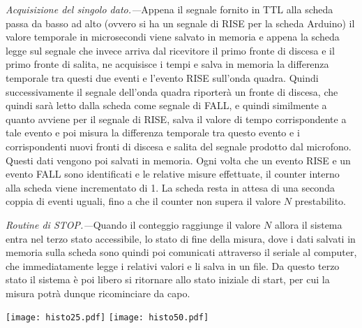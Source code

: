 \documentclass[
    rmp,
    reprint, 
    superscriptaddress, 
    altaffilletter, 
    amsmath, 
    amssymb, 
    a4paper,
    varvw]{revtex4-2}
\begin{document}
\noindent\textit{Acquisizione del singolo dato.---}Appena il segnale fornito in TTL alla scheda passa da basso ad alto (ovvero si ha un segnale di RISE per la scheda Arduino) il valore temporale in microsecondi viene salvato in memoria e appena la scheda legge sul segnale che invece arriva dal ricevitore il primo fronte di discesa e il primo fronte di salita, ne acquisisce i tempi e salva in memoria la differenza temporale tra questi due eventi e l'evento RISE sull'onda quadra. Quindi successivamente il segnale dell'onda quadra riporterà un fronte di discesa, che quindi sarà letto dalla scheda come segnale di FALL, e quindi similmente a quanto avviene per il segnale di RISE, salva il valore di tempo corrispondente a tale evento e poi misura la differenza temporale tra questo evento e i corrispondenti nuovi fronti di discesa e salita del segnale prodotto dal microfono. Questi dati vengono poi salvati in memoria. Ogni volta che un evento RISE e un evento FALL sono identificati e le relative misure effettuate, il counter interno alla scheda viene incrementato di 1. La scheda resta in attesa di una seconda coppia di eventi uguali, fino a che il counter non supera il valore $N$ prestabilito. 

\noindent\textit{Routine di \emph{STOP}.---}Quando il conteggio raggiunge il valore $N$ allora il sistema entra nel terzo stato accessibile, lo stato di fine della misura, dove i dati salvati in memoria sulla scheda sono quindi poi comunicati attraverso il seriale al computer, che immediatamente legge i relativi valori e li salva in un file. Da questo terzo stato il sistema è poi libero si ritornare allo stato iniziale di start, per cui la misura potrà dunque ricominciare da capo. 

\begin{figure*}
    \texttt{[image: histo25.pdf]}
    \texttt{[image: histo50.pdf]}
    \caption{Istogrammi dei set di dati raccolti (sono riportati quelli per le misure a \SI{0.25}{\metre} e quelle per le misure a \SI{0.5}{\metre}). Per ogni distanza sono raccolti $N=50$ punti, sia per l'evento RISE che per l'evento FALL, in due istanti differenti, un per il primo fronte di variazione del segnale fornito dal microfono, uno per il secondo fronte. La media tra queste due misure permette di ottenere poi una misura più precisa dell'effettivo fronte d'onda che viene rilevato dal microfono. }\label{fig:hists_test}
\end{figure*}
\end{document}
